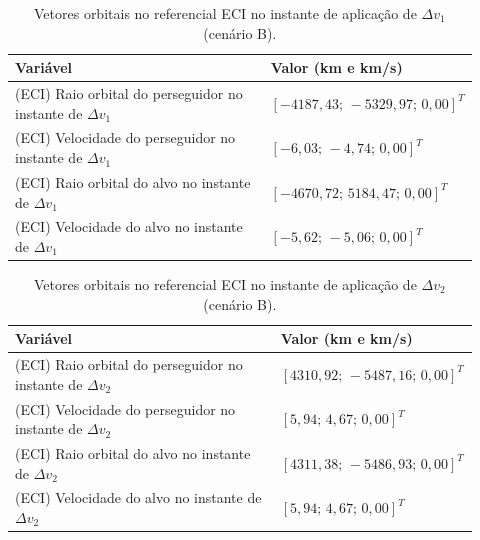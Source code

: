 \begin{table}[H]
\centering
\caption{Vetores orbitais no referencial ECI no instante de aplicação de $\Delta v_1$ (cenário B).}
\label{tab:cap4_eciB_dv1}
\begingroup
\small
\setlength{\tabcolsep}{4pt}
\renewcommand{\arraystretch}{1.15}
\begin{tabular}{|p{0.58\linewidth}|p{0.34\linewidth}|}
\hline
Variável & Valor (km e km/s)\\
\hline
(ECI) Raio orbital do perseguidor no instante de $\Delta v_1$ &
$\left[-4187,43;\,-5329,97;\,0,00\right]^T$\\
\hline
(ECI) Velocidade do perseguidor no instante de $\Delta v_1$ &
$\left[-6,03;\,-4,74;\,0,00\right]^T$\\
\hline
(ECI) Raio orbital do alvo no instante de $\Delta v_1$ &
$\left[-4670,72;\,5184,47;\,0,00\right]^T$\\
\hline
(ECI) Velocidade do alvo no instante de $\Delta v_1$ &
$\left[-5,62;\,-5,06;\,0,00\right]^T$\\
\hline
\end{tabular}
\endgroup
\end{table}

\begin{table}[H]
\centering
\caption{Vetores orbitais no referencial ECI no instante de aplicação de $\Delta v_2$ (cenário B).}
\label{tab:cap4_eciB_dv2}
\begingroup
\small
\setlength{\tabcolsep}{4pt}
\renewcommand{\arraystretch}{1.15}
\begin{tabular}{|p{0.58\linewidth}|p{0.34\linewidth}|}
\hline
Variável & Valor (km e km/s)\\
\hline
(ECI) Raio orbital do perseguidor no instante de $\Delta v_2$ &
$\left[4310,92;\,-5487,16;\,0,00\right]^T$\\
\hline
(ECI) Velocidade do perseguidor no instante de $\Delta v_2$ &
$\left[5,94;\,4,67;\,0,00\right]^T$\\
\hline
(ECI) Raio orbital do alvo no instante de $\Delta v_2$ &
$\left[4311,38;\,-5486,93;\,0,00\right]^T$\\
\hline
(ECI) Velocidade do alvo no instante de $\Delta v_2$ &
$\left[5,94;\,4,67;\,0,00\right]^T$\\
\hline
\end{tabular}
\endgroup
\end{table}

